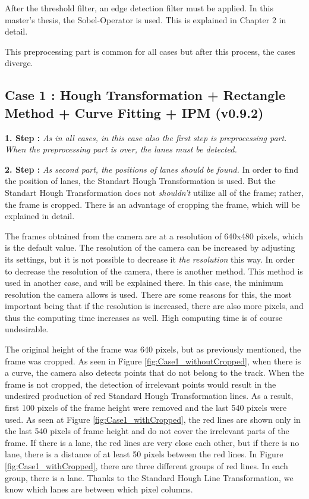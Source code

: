 After the threshold filter, an edge detection filter must be applied. In this master's thesis, the Sobel-Operator is used. This is explained in Chapter 2 in detail.
 
This preprocessing part is common for all cases but after this process, the cases diverge. 
 
%
\subsection{Case 1 : Hough Transformation + Rectangle Method + Curve Fitting + IPM (v0.9.2)}\label{sec:Case 1}


\textbf{1. Step : }\emph{\color{blue}As in all cases, in this case also the first step is preprocessing part. When the preprocessing part is over, the lanes must be detected. }

\textbf{2. Step : }\emph{\color{blue} As second part, the positions of lanes should be found.} In order to find the position of lanes, the Standart Hough Transformation is used. But the Standart Hough Transformation does not \emph{\color{blue}shouldn't} utilize all of the frame; rather, the frame is cropped. There is an advantage of cropping the frame, which will be explained in detail.


The frames obtained from the camera are at a resolution of 640x480 pixels, which is the default value. The resolution of the camera can be increased by adjusting its settings, but it is not possible to decrease it \emph{\color{blue}the resolution} this way. In order to decrease the resolution of the camera, there is another method. This method is used in another case, and will be explained there. In this case, the minimum resolution the camera allows is used. There are some reasons for this, the most important being that if the resolution is increased, there are also more pixels, and thus the computing time increases as well. High computing time is of course undesirable.
 
The original height of the frame was 640 pixels, but as previously mentioned, the frame was cropped. As seen in Figure \ref{fig:Case1_withoutCropped}, when there is a curve, the camera also detects points that do not belong to the track. When the frame is not cropped, the detection of irrelevant points would result in the undesired production of red Standard Hough Transformation lines. As a result, first 100 pixels of the frame height were removed and the last 540 pixels were used. As seen at Figure \ref{fig:Case1_withCropped}, the red lines are shown only in the last 540 pixels of frame height and do not cover the irrelevant parts of the frame. If there is a lane, the red lines are very close each other, but if there is no lane, there is a distance of at least 50 pixels between the red lines. In Figure \ref{fig:Case1_withCropped}, there are three different groups of red lines. In each group, there is a lane. Thanks to the Standard Hough Line Transformation, we know which lanes are between which pixel columns.

